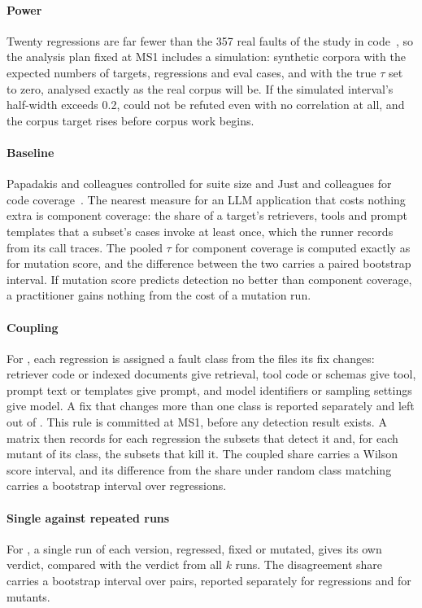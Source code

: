 \documentclass[11pt]{article}
\begin{document}
\paragraph{Power} Twenty regressions are far fewer than the 357 real faults of the study in code~\cite{Just2014}, so the analysis plan fixed at MS1 includes a simulation: synthetic corpora with the expected numbers of targets, regressions and eval cases, and with the true $\tau$ set to zero, analysed exactly as the real corpus will be. If the simulated interval's half-width exceeds 0.2,  could not be refuted even with no correlation at all, and the corpus target rises before corpus work begins.

\paragraph{Baseline} Papadakis and colleagues controlled for suite size and Just and colleagues for code coverage~\cite{Just2014,Papadakis2018}. The nearest measure for an LLM application that costs nothing extra is component coverage: the share of a target's retrievers, tools and prompt templates that a subset's cases invoke at least once, which the runner records from its call traces. The pooled $\tau$ for component coverage is computed exactly as for mutation score, and the difference between the two carries a paired bootstrap interval. If mutation score predicts detection no better than component coverage, a practitioner gains nothing from the cost of a mutation run.

\paragraph{Coupling} For , each regression is assigned a fault class from the files its fix changes: retriever code or indexed documents give retrieval, tool code or schemas give tool, prompt text or templates give prompt, and model identifiers or sampling settings give model. A fix that changes more than one class is reported separately and left out of . This rule is committed at MS1, before any detection result exists. A matrix then records for each regression the subsets that detect it and, for each mutant of its class, the subsets that kill it. The coupled share carries a Wilson score interval, and its difference from the share under random class matching carries a bootstrap interval over regressions.

\paragraph{Single against repeated runs} For , a single run of each version, regressed, fixed or mutated, gives its own verdict, compared with the verdict from all $k$ runs. The disagreement share carries a bootstrap interval over pairs, reported separately for regressions and for mutants.
\end{document}
